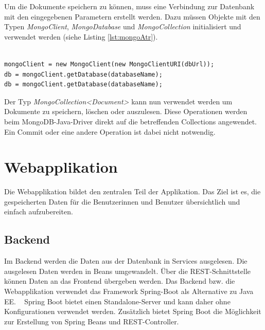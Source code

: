 Um die Dokumente speichern zu können, muss eine Verbindung zur Datenbank mit den eingegebenen Parametern erstellt werden. Dazu müssen Objekte mit den Typen \textit{MongoClient}, \textit{MongoDatabase} und \textit{MongoCollection} initialisiert und verwendet werden (siehe Listing \ref{lst:mongoAtr}).

\lstset{
  caption={Benötigte Attribute, um sich mit der Datenbank verbinden und die Collections verwenden.}, 
  basicstyle=\small\ttfamily, 
  label=lst:mongoAtr, 
  language=Java,
  frame=single,
  breaklines=true, %
  postbreak=\mbox{\textcolor{red}{$\hookrightarrow$}\space},
}

\begin{samepage}%
	\begin{lstlisting}[float=tbhp]
	
mongoClient = new MongoClient(new MongoClientURI(dbUrl));
db = mongoClient.getDatabase(databaseName);
db = mongoClient.getDatabase(databaseName);

	\end{lstlisting}
\end{samepage}

Der Typ \textit{MongoCollection<Document>} kann nun verwendet werden um Dokumente zu speichern, löschen oder auszulesen. Diese Operationen werden beim MongoDB-Java-Driver direkt auf die betreffenden Collections angewendet. Ein Commit oder eine andere Operation ist dabei nicht notwendig.


\section{Webapplikation} 
Die Webapplikation bildet den zentralen Teil der Applikation. Das Ziel ist es, die gespeicherten Daten für die Benutzerinnen und Benutzer übersichtlich und einfach aufzubereiten. 
\subsection{Backend}
Im Backend werden die Daten aus der Datenbank in Services ausgelesen. Die ausgelesen Daten werden in Beans umgewandelt. Über die REST-Schnittstelle können Daten an das Frontend übergeben werden. Das Backend bzw. die Webapplikation verwendet das Framework Spring-Boot als Alternative zu Java EE. ~\parencite{walls2016spring} Spring Boot bietet einen Standalone-Server und kann daher ohne Konfigurationen verwendet werden. Zusätzlich bietet Spring Boot die Möglichkeit zur Erstellung von Spring Beans und REST-Controller.  

